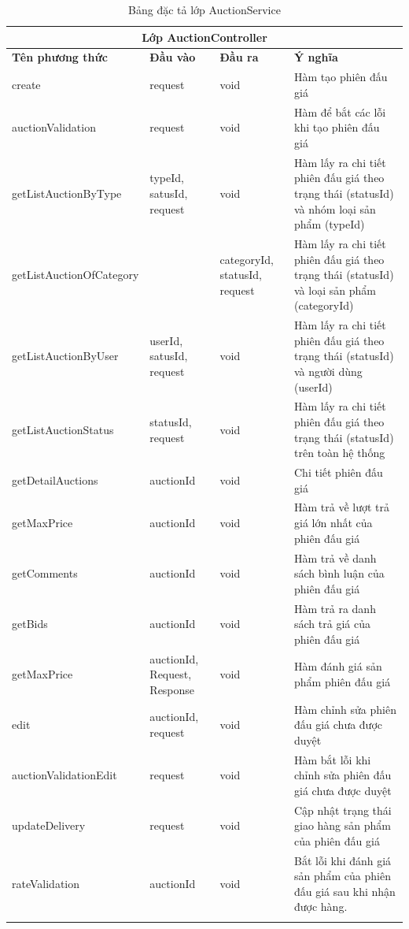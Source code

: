 \documentclass{article}
\begin{document}
    \begin{longtable}{| p{} | p{} | p{} | p{} |} 
    \hline
        \multicolumn{4}{|c|}{Lớp AuctionController}\\\hline
        \bfseries Tên phương thức & \bfseries Đầu vào & \bfseries Đầu ra & \bfseries Ý nghĩa  \\\hline
        create & request & void & Hàm tạo phiên đấu giá\\\hline
        auctionValidation & request & void & Hàm để bắt các lỗi khi tạo phiên đấu giá\\\hline
        getListAuctionByType & typeId, satusId, request & void & Hàm lấy ra chi tiết phiên đấu giá theo trạng thái (statusId) và nhóm loại sản phẩm (typeId)\\\hline
        getListAuctionOfCategory & & categoryId, statusId, request & Hàm lấy ra chi tiết phiên đấu giá theo trạng thái (statusId) và loại sản phẩm (categoryId)\\\hline
        getListAuctionByUser & userId, satusId, request& void & Hàm lấy ra chi tiết phiên đấu giá theo trạng thái (statusId) và người dùng (userId)\\\hline
        getListAuctionStatus & statusId, request & void & Hàm lấy ra chi tiết phiên đấu giá theo trạng thái (statusId) trên toàn hệ thống\\\hline
        getDetailAuctions & auctionId & void & Chi tiết phiên đấu giá\\\hline
        getMaxPrice & auctionId & void & Hàm trả về lượt trả giá lớn nhất của phiên đấu giá\\\hline
        getComments & auctionId & void & Hàm trả về danh sách bình luận của phiên đấu giá\\\hline
        getBids & auctionId & void & Hàm trả ra danh sách trả giá của phiên đấu giá\\\hline
        getMaxPrice & auctionId, Request, Response & void & Hàm đánh giá sản phẩm phiên đấu giá\\\hline
        edit & auctionId, request & void & Hàm chỉnh sửa phiên đấu giá chưa được duyệt\\\hline
        auctionValidationEdit & request & void & Hàm bắt lỗi khi chỉnh sửa phiên đấu giá chưa được duyệt\\\hline
        updateDelivery & request & void & Cập nhật trạng thái giao hàng sản phẩm của phiên đấu giá\\\hline
        rateValidation & auctionId & void & Bắt lỗi khi đánh giá sản phẩm của phiên đấu giá sau khi nhận được hàng.\\\hline
    \caption{Bảng đặc tả lớp AuctionService}
    \label{bang45}
    \end{longtable}
\end{document}
